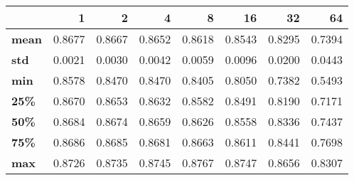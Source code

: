 \begin{tabular}{lrrrrrrr}
\toprule
{} &      1  &      2  &      4  &      8  &      16 &      32 &      64 \\
\midrule
\textbf{mean} &  0.8677 &  0.8667 &  0.8652 &  0.8618 &  0.8543 &  0.8295 &  0.7394 \\
\textbf{std } &  0.0021 &  0.0030 &  0.0042 &  0.0059 &  0.0096 &  0.0200 &  0.0443 \\
\textbf{min } &  0.8578 &  0.8470 &  0.8470 &  0.8405 &  0.8050 &  0.7382 &  0.5493 \\
\textbf{25\% } &  0.8670 &  0.8653 &  0.8632 &  0.8582 &  0.8491 &  0.8190 &  0.7171 \\
\textbf{50\% } &  0.8684 &  0.8674 &  0.8659 &  0.8626 &  0.8558 &  0.8336 &  0.7437 \\
\textbf{75\% } &  0.8686 &  0.8685 &  0.8681 &  0.8663 &  0.8611 &  0.8441 &  0.7698 \\
\textbf{max } &  0.8726 &  0.8735 &  0.8745 &  0.8767 &  0.8747 &  0.8656 &  0.8307 \\
\bottomrule
\end{tabular}
